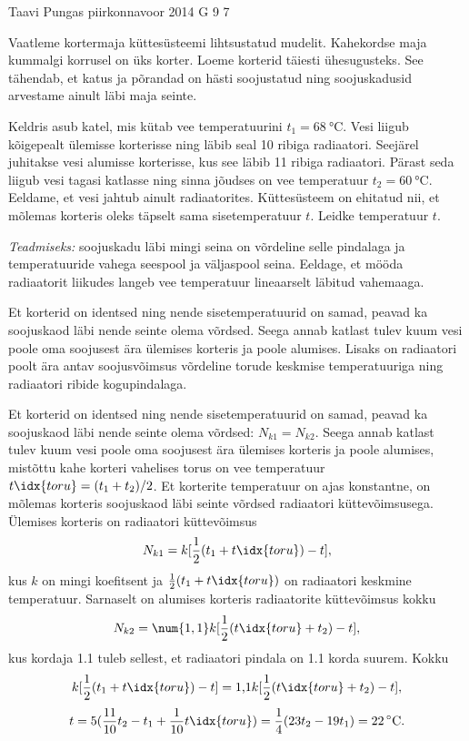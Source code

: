 {Taavi Pungas} %
{piirkonnavoor} %
{2014} %
{G 9} %
{7} %
{
\ifStatement
Vaatleme kortermaja küttesüsteemi lihtsustatud mudelit. Kahekordse maja kummalgi korrusel on üks korter. Loeme korterid täiesti ühesugusteks. See tähendab, et katus ja põrandad on hästi soojustatud ning soojuskadusid arvestame ainult läbi maja seinte. 

Keldris asub katel, mis kütab vee temperatuurini $t_1=\SI{68}{\celsius}$. Vesi liigub kõigepealt ülemisse korterisse ning läbib seal 10 ribiga radiaatori. Seejärel juhitakse vesi alumisse korterisse, kus see läbib 11 ribiga radiaatori. Pärast seda liigub vesi tagasi katlasse ning sinna jõudses on vee temperatuur $t_2=\SI{60}{\celsius}$. Eeldame, et vesi jahtub ainult radiaatorites. Küttesüsteem on ehitatud nii, et mõlemas korteris oleks täpselt sama sisetemperatuur $t$. Leidke temperatuur $t$. 

\emph{Teadmiseks:} soojuskadu läbi mingi seina on võrdeline selle pindalaga ja temperatuuride vahega seespool ja väljaspool seina. Eeldage, et mööda radiaatorit liikudes langeb vee temperatuur lineaarselt läbitud vahemaaga.
\fi


\ifHint
Et korterid on identsed ning nende sisetemperatuurid on samad, peavad ka soojuskaod läbi nende seinte olema võrdsed. Seega annab katlast tulev kuum vesi poole oma soojusest ära ülemises korteris ja poole alumises. Lisaks on radiaatori poolt ära antav soojusvõimsus võrdeline torude keskmise temperatuuriga ning radiaatori ribide kogupindalaga.
\fi


\ifSolution
Et korterid on identsed ning nende sisetemperatuurid on samad, peavad ka soojuskaod läbi nende seinte olema võrdsed: $N_{k1}=N_{k2}$. Seega annab katlast tulev kuum vesi poole oma soojusest ära ülemises korteris ja poole alumises, mistõttu kahe korteri vahelises torus on vee temperatuur $t\idx{toru}=(t_1+t_2)/2$. Et korterite temperatuur on ajas konstantne, on mõlemas korteris soojuskaod läbi seinte võrdsed radiaatori küttevõimsusega. Ülemises korteris on radiaatori küttevõimsus
\[
N_{k1}=k[\frac{1}{2}(t_1+t\idx{toru})-t],
\]
kus $k$ on mingi koefitsent ja $\frac{1}{2}(t_1+t\idx{toru})$ on radiaatori keskmine temperatuur. Sarnaselt on alumises korteris radiaatorite küttevõimsus kokku
\[
N_{k2}=\num{1,1} k[\frac{1}{2}(t\idx{toru}+t_{2})-t],
\]
kus kordaja \num{1,1} tuleb sellest, et radiaatori pindala on \num{1,1} korda suurem. Kokku
\[ k[\frac{1}{2}(t_1+t\idx{toru})-t]=\text{1,1}k[\frac{1}{2}(t\idx{toru}+t_{2})-t], \]
\[ t=5 (\frac{11}{10}t_2-t_1+\frac{1}{10}t\idx{toru})=\frac{1}{4}(23t_2-19t_1)=22\,^{\circ}\mathrm{C}. \]
\fi


}
